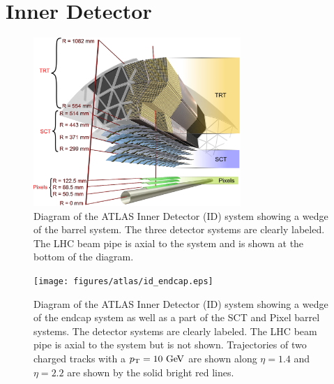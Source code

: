 \section{Inner Detector}
\label{sec:atlas_id}

\begin{figure}[ht!]
\centering
\includegraphics[width=0.7\textwidth]{figures/atlas/id_barrel.eps}
\caption{Diagram of the ATLAS Inner Detector (ID) system showing 
a wedge of the barrel system.  The three detector systems
are clearly labeled. The LHC beam pipe is axial to the system
and is shown at the bottom of the diagram.}
\label{fig:atlas_id_barrel}
\end{figure}

\begin{figure}[ht!]
\centering
\texttt{[image: figures/atlas/id\_endcap.eps]}
\caption{Diagram of the ATLAS Inner Detector (ID) system showing 
a wedge of the endcap system as well as a part of the SCT and Pixel
barrel systems.  The detector systems
are clearly labeled.  The LHC beam pipe is axial to the system
but is not shown. Trajectories of two charged tracks 
with a $\pt=10\GeV$ are shown along $\eta=1.4$ and $\eta=2.2$ are shown 
by the solid bright red lines.}
\label{fig:atlas_id_endcap}
\end{figure}

